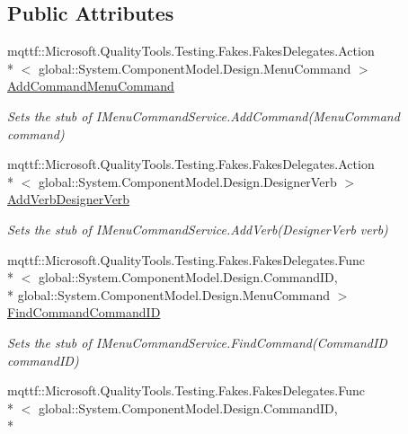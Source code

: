 \subsection*{Public Attributes}
\begin{DoxyCompactItemize}
\item 
mqttf\-::\-Microsoft.\-Quality\-Tools.\-Testing.\-Fakes.\-Fakes\-Delegates.\-Action\\*
$<$ global\-::\-System.\-Component\-Model.\-Design.\-Menu\-Command $>$ \hyperlink{class_system_1_1_component_model_1_1_design_1_1_fakes_1_1_stub_i_menu_command_service_ad8fc10673ba8f28397489fbbeeb276ff}{Add\-Command\-Menu\-Command}
\begin{DoxyCompactList}\small\item\em Sets the stub of I\-Menu\-Command\-Service.\-Add\-Command(\-Menu\-Command command)\end{DoxyCompactList}\item 
mqttf\-::\-Microsoft.\-Quality\-Tools.\-Testing.\-Fakes.\-Fakes\-Delegates.\-Action\\*
$<$ global\-::\-System.\-Component\-Model.\-Design.\-Designer\-Verb $>$ \hyperlink{class_system_1_1_component_model_1_1_design_1_1_fakes_1_1_stub_i_menu_command_service_ac410b86577856e1aea8c77b4f473c171}{Add\-Verb\-Designer\-Verb}
\begin{DoxyCompactList}\small\item\em Sets the stub of I\-Menu\-Command\-Service.\-Add\-Verb(\-Designer\-Verb verb)\end{DoxyCompactList}\item 
mqttf\-::\-Microsoft.\-Quality\-Tools.\-Testing.\-Fakes.\-Fakes\-Delegates.\-Func\\*
$<$ global\-::\-System.\-Component\-Model.\-Design.\-Command\-I\-D, \\*
global\-::\-System.\-Component\-Model.\-Design.\-Menu\-Command $>$ \hyperlink{class_system_1_1_component_model_1_1_design_1_1_fakes_1_1_stub_i_menu_command_service_aefc8704d4ce721f1f4cfcf517cf9e899}{Find\-Command\-Command\-I\-D}
\begin{DoxyCompactList}\small\item\em Sets the stub of I\-Menu\-Command\-Service.\-Find\-Command(\-Command\-I\-D command\-I\-D)\end{DoxyCompactList}\item 
mqttf\-::\-Microsoft.\-Quality\-Tools.\-Testing.\-Fakes.\-Fakes\-Delegates.\-Func\\*
$<$ global\-::\-System.\-Component\-Model.\-Design.\-Command\-I\-D, \\*

\end{DoxyCompactItemize}
